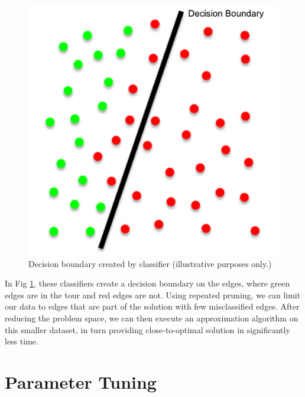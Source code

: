 \documentclass[]{UCD_CS_FYP_Report}
\begin{document}
\newpage
\begin{figure}[h]
    \centering
  \includegraphics[width=0.5\linewidth]{Figures/Prune.pdf}
  \caption{Decision boundary created by classifier (illustrative purposes only.)}
  \label{fig:Prune}
\end{figure}
In Fig \ref{fig:Prune}, these classifiers create a decision boundary on the edges, where green edges are in the tour and red edges are not. Using repeated pruning, we can limit our data to edges that are part of the solution with few misclassified edges. After reducing the problem space, we can then execute an approximation algorithm on this smaller dataset, in turn providing close-to-optimal solution in significantly less time.

\section{Parameter Tuning}\label{parmeter_tuning}
\end{document}
